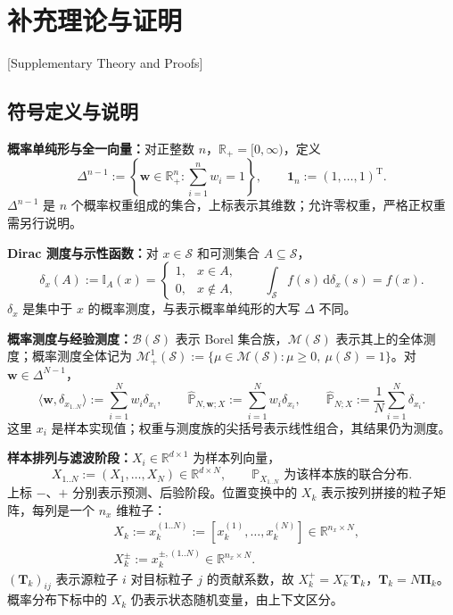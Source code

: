 \chapter{补充理论与证明}[Supplementary Theory and Proofs]\label{cw:app:appendix}
\section{符号定义与说明}\label{cw:app:notation}

\textbf{概率单纯形与全一向量：}对正整数 $n$，$\mathbb R_+=[0,\infty)$，定义
\begin{equation*}
\Delta^{n-1}:=\left\{\bm w\in\mathbb R_+^n:\sum_{i=1}^n w_i=1\right\},\qquad
\mathbf1_n:=(1,\dots,1)^{\mathrm T}.
\end{equation*}
$\Delta^{n-1}$ 是 $n$ 个概率权重组成的集合，上标表示其维数；允许零权重，严格正权重需另行说明。

\textbf{Dirac 测度与示性函数：}对 $x\in\mathcal S$ 和可测集合 $A\subseteq\mathcal S$，
\begin{equation*}
\delta_x(A):=\mathbb I_A(x)=
\begin{cases}1,&x\in A,\\0,&x\notin A,\end{cases}
\qquad \int_{\mathcal S}f(s)\,\mathrm d\delta_x(s)=f(x).
\end{equation*}
$\delta_x$ 是集中于 $x$ 的概率测度，与表示概率单纯形的大写 $\Delta$ 不同。

\textbf{概率测度与经验测度：}$\mathcal B(\mathcal S)$ 表示 Borel 集合族，$\mathcal M(\mathcal S)$ 表示其上的全体测度；概率测度全体记为 $\mathcal M_+^1(\mathcal S):=\{\mu\in\mathcal M(\mathcal S):\mu\ge0,\ \mu(\mathcal S)=1\}$。对 $\bm w\in\Delta^{N-1}$，
\begin{equation*}
\langle\bm w,\delta_{x_{1..N}}\rangle:=\sum_{i=1}^Nw_i\delta_{x_i},\qquad
\hat{\mathbb P}_{N,\bm w;X}:=\sum_{i=1}^Nw_i\delta_{x_i},\qquad
\hat{\mathbb P}_{N;X}:=\frac1N\sum_{i=1}^N\delta_{x_i}.
\end{equation*}
这里 $x_i$ 是样本实现值；权重与测度族的尖括号表示线性组合，其结果仍为测度。

\textbf{样本排列与滤波阶段：}$X_i\in\mathbb R^{d\times1}$ 为样本列向量，
\begin{equation*}
X_{1..N}:=(X_1,\dots,X_N)\in\mathbb R^{d\times N},\qquad
\mathbb P_{X_{1..N}}\text{ 为该样本族的联合分布}.
\end{equation*}
上标 $-$、$+$ 分别表示预测、后验阶段。位置变换中的 $X_k$ 表示按列拼接的粒子矩阵，每列是一个 $n_x$ 维粒子：
\begin{equation*}
\begin{aligned}
&X_k:=x_k^{(1..N)}:=[x_k^{(1)},\dots,x_k^{(N)}]\in\mathbb R^{n_x\times N},\\
&X_k^\pm:=x_k^{\pm,(1..N)}\in\mathbb R^{n_x\times N}.
\end{aligned}
\end{equation*}
$(\bm T_k)_{ij}$ 表示源粒子 $i$ 对目标粒子 $j$ 的贡献系数，故 $X_k^+=X_k^-\bm T_k$，$\bm T_k=N\bm\Pi_k$。概率分布下标中的 $X_k$ 仍表示状态随机变量，由上下文区分。

